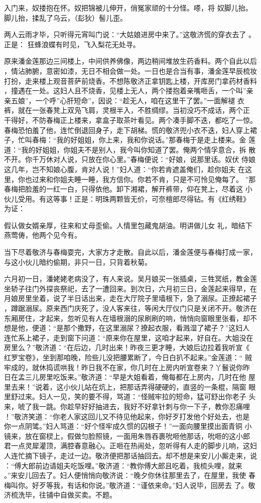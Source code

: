 入门来，奴搂抱在怀。奴把锦被儿伸开，俏冤家顽的十分怪。嗏，将
奴脚儿抬。脚儿抬，揉乱了乌云，（髟狄）髻儿歪。

两人云雨才毕，只听得元宵叫门说：“大姑娘进房中来了。”这敬济慌的穿衣去了
。正是：
狂蜂浪蝶有时见，飞入梨花无处寻。

原来潘金莲那边三间楼上，中间供养佛像，两边稍间堆放生药香料。两个自此以后
，情沾肺腑，意密如漆，无日不相会做一处。一日也是合当有事，潘金莲早辰梳妆
打扮，走来楼上观音菩萨前烧香。不想陈敬济正拿钥匙上楼，开库房门拿药材香料
，撞遇在一处。这妇人且不烧香，见楼上无人，两个搂抱着亲嘴咂舌，一个叫”亲
亲五娘”，一个呼”心肝短命”，因说：“趁无人，咱在这里干了罢。”一面解褪
衣裤，就在一张春凳上双凫飞肩，灵根半入，不胜绸缪。当初没巧不成话，两个正
干得好，不防春梅正上楼来，拿盒子取茶叶看见。两个凑手脚不迭，都吃了一惊。
春梅恐怕羞了他，连忙倒退回身子，走下胡梯。慌的敬济兜小衣不迭，妇人穿上裙
子，忙叫春梅：“我的好姐姐，你上来，我和你说话。”那春梅于是走上楼来。金
莲道：“我的好姐姐，你姐夫不是别人，我今叫你知道了罢。俺两个情孚意合，拆
散不开。你千万休对人说，只放在你心里。”春梅便说：“好娘，说那里话。奴伏
侍娘这几年，岂不知娘心腹，肯对人说！”妇人道：“你若肯遮盖俺们，趁你姐夫
在这里，你也过来和你姐夫睡一睡，我方信你。你若不肯，只是不可怜见俺每了。
”那春梅把脸羞的一红一白，只得依他。卸下湘裙，解开裤带，仰在凳上，尽着这
小伙儿受用。有这等事！正是：明珠两颗皆无价，可奈檀郎尽得钻。有《红绣鞋》
为证：

假认做女婿亲厚，往来和丈母歪偷。人情里包藏鬼胡油。明讲做儿女
礼，暗结下燕莺俦，他两个见今有。

当下尽着敬济与春梅耍完，大家方才走散。自此以后，潘金莲便与春梅打成一家，
与这小伙儿暗约偷期，非只一日，只背着秋菊。

六月初一日，潘姥姥老病没了，有人来说。吴月娘买一张插桌，三牲冥纸，教金莲
坐轿子往门外探丧祭祀，去了一遭回来。到次日，六月初三日，金莲起来得早，在
月娘房里坐着，说了半日话出来，走在大厅院子里墙根下，急了溺尿。正撩起裙子
，蹲踞溺尿。原来西门庆死了，没人客来往，等闲大厅仪门只是关闭不开。敬济在
东厢房住，才起来，忽听见有人在墙根溺的尿刷刷的响，悄悄向窗眼里张看，却不
想是他，便道：“是那个撒野，在这里溺尿？撩起衣服，看溅湿了裙子？”这妇人
连忙系上裙子，走到窗下问道：“原来你在屋里，这咱才起来，好自在。大姐没在
房里么？”敬济道：“在后边，几时出来！昨夜三更才睡，大娘后边拉着我听宣《
红罗宝卷》，坐到那咱晚，险些儿没把腰累断了，今日白扒不起来。”金莲道：“
贼牢成的，就休捣谎哄我！昨日我不在家，你几时在上房内听宣卷来？丫鬟说你昨
日在孟三儿房里吃饭来。”敬济道：“早是大姐看着，俺每都在上房内，几时在他
屋里去来！”说着，这小伙儿站在炕上，把那话弄得硬硬的，直竖的一条棍，隔窗
眼里舒过来。妇人一见，笑的要不得，骂道：“怪贼牢拉的短命，猛可舒出你老子
头来，唬了我一跳。你趁早好好抽进去，我好不好拿针刺与你一下子，教你忍痛哩
！”敬济笑道：“你老人家这回儿又不待见他起来，你好歹打发他个好处去，也是
你一点阴骘。”妇人骂道：“好个怪牢成久惯的囚根子！”一面向腰里摸出面青铜
小镜来，放在窗棂上，假做匀脸照镜，一面用朱唇吞裹吮咂他那话，吮咂的这小郎
君一点灵犀灌顶，满腔春意融心。正咂在热闹处，忽听得有人走的脚步儿响，这妇
人连忙摘下镜子，走过一边。敬济便把那话抽回去。却不想是来安儿小厮走来，说
：“傅大郎前边请姐夫吃饭哩。”敬济道：“教你傅大郎且吃着，我梳头哩，就来
。”来安儿回去了。妇人便悄悄向敬济说：“晚夕你休往那里去了，在屋里，我使
春梅叫你。好歹等我，有话和你说。”敬济道：“谨依来命。”妇人说毕，回房去
了。敬济梳洗毕，往铺中自做买卖。不题。

